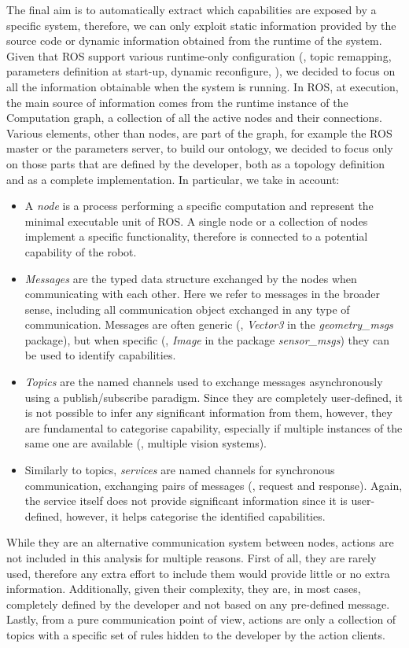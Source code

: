 The final aim is to automatically extract which capabilities are exposed by a specific system, therefore, we can only exploit static information provided by the source code or dynamic information obtained from the runtime of the system. Given that ROS support various runtime-only configuration (\eg, topic remapping, parameters definition at start-up, dynamic reconfigure, \etc), we decided to focus on all the information obtainable when the system is running. In ROS, at execution, the main source of information comes from the runtime instance of the Computation graph, a collection of all the active nodes and their connections. Various elements, other than nodes, are part of the graph, for example the ROS master or the parameters server, to build our ontology, we decided to focus only on those parts that are defined by the developer, both as a topology definition and as a complete implementation. In particular, we take in account:
\begin{itemize}
\item A \textit{node} is a process performing a specific computation and represent the minimal executable unit of ROS. A single node or a collection of nodes implement a specific functionality, therefore is connected to a potential capability of the robot.
\item \textit{Messages} are the typed data structure exchanged by the nodes when communicating with each other. Here we refer to messages in the broader sense, including all communication object exchanged in any type of communication. Messages are often generic (\eg, \textit{Vector3} in the \textit{geometry\_msgs} package), but when specific (\eg, \textit{Image} in the package \textit{sensor\_msgs})  they can be used to identify capabilities.
\item \textit{Topics} are the named channels used to exchange messages asynchronously using a publish/subscribe paradigm. Since they are completely user-defined, it is not possible to infer any significant information from them, however, they are fundamental to categorise capability, especially if multiple instances of the same one are available (\eg, multiple vision systems).
\item Similarly to topics, \textit{services} are named channels for synchronous communication, exchanging pairs of messages (\ie, request and response). Again, the service itself does not provide significant information since it is user-defined, however, it helps categorise the identified capabilities.  
\end{itemize}
While they are an alternative communication system between nodes, actions are not included in this analysis for multiple reasons. First of all, they are rarely used, therefore any extra effort to include them would provide little or no extra information. Additionally, given their complexity, they are, in most cases, completely defined by the developer and not based on any pre-defined message. Lastly, from a pure communication point of view, actions are only a collection of topics with a specific set of rules hidden to the developer by the action clients. 

